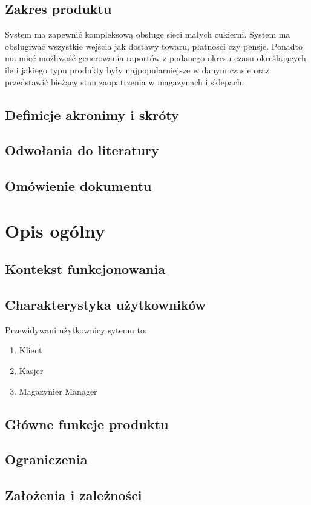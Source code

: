 \documentclass[16pt,a4paper]{article}
\begin{document}
\subsection{Zakres produktu}
System ma zapewnić kompleksową obsługę sieci małych cukierni. System ma obsługiwać wszystkie wejścia jak dostawy towaru, płatności czy pensje. Ponadto ma mieć możliwość generowania raportów z podanego okresu czasu określających ile i jakiego typu produkty były najpopularniejsze w danym czasie oraz przedstawić bieżący stan zaopatrzenia w magazynach i sklepach. 
\subsection{Definicje akronimy i skróty}
\subsection{Odwołania do literatury}
\subsection{Omówienie dokumentu}
\section{Opis ogólny}
\subsection{Kontekst funkcjonowania}
\subsection{Charakterystyka użytkowników}
Przewidywani użytkownicy sytemu to:
\begin{enumerate}
\item Klient
\item Kasjer
\item Magazynier
\itrm Manager 
\end{enumerate}
\subsection{Główne funkcje produktu}
\subsection{Ograniczenia}
\subsection{Założenia i zależności}
\end{document}
